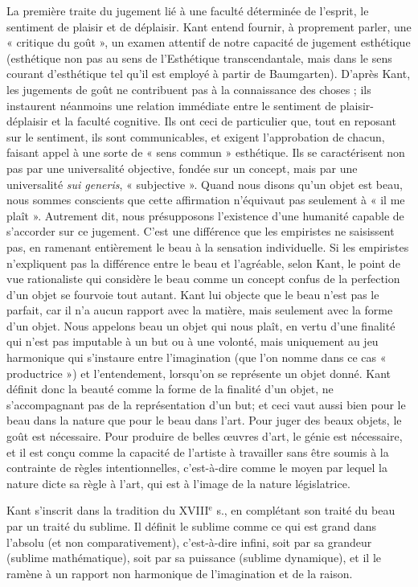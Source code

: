 La première traite du jugement lié à
une faculté déterminée de l'esprit, le sentiment
de plaisir et de déplaisir. Kant
entend fournir, à proprement parler, une
« critique du goût », un examen attentif
de notre capacité de jugement esthétique
(esthétique non pas au sens de l’Esthétique
transcendantale, mais dans le sens
courant d’esthétique tel qu’il est employé
à partir de Baumgarten). D’après Kant,
les jugements de goût ne contribuent pas
à la connaissance des choses ; ils instaurent
néanmoins une relation immédiate
entre le sentiment de plaisir-déplaisir et la
faculté cognitive. Ils ont ceci de particulier
que, tout en reposant sur le sentiment,
ils sont communicables, et exigent l’approbation
de chacun, faisant appel à une
sorte de « sens commun » esthétique. Ils
se caractérisent non pas par une universalité
objective, fondée sur un concept, mais
par une universalité {\it sui generis}, « subjective ».
Quand nous disons qu’un objet est
beau, nous sommes conscients que cette
affirmation n’équivaut pas seulement à
« il me plaît ». Autrement dit, nous présupposons
l'existence d’une humanité
capable de s’accorder sur ce jugement.
C’est une différence que les empiristes ne
saisissent pas, en ramenant entièrement le
beau à la sensation individuelle. Si les
empiristes n’expliquent pas la différence
entre le beau et l’agréable, selon Kant, le
point de vue rationaliste qui considère le
beau comme un concept confus de la perfection
d’un objet se fourvoie tout autant.
Kant lui objecte que le beau n’est pas le
parfait, car il n’a aucun rapport avec la
matière, mais seulement avec la forme
d’un objet. Nous appelons beau un objet
qui nous plaît, en vertu d’une finalité qui
n’est pas imputable à un but ou à une
volonté, mais uniquement au jeu harmonique
qui s’instaure entre l'imagination
(que l’on nomme dans ce cas « productrice »)
et l’entendement, lorsqu'on se
représente un objet donné. Kant définit
donc la beauté comme la forme de la finalité
d’un objet, ne s’accompagnant pas de
la représentation d’un but; et ceci vaut
aussi bien pour le beau dans la nature que
pour le beau dans l’art. Pour juger des
beaux objets, le goût est nécessaire. Pour
produire de belles œuvres d’art, le génie
%
est nécessaire, et il est conçu comme la
capacité de l’artiste à travailler sans être
soumis à la contrainte de règles intentionnelles,
c’est-à-dire comme le moyen par
lequel la nature dicte sa règle à l’art, qui
est à l’image de la nature législatrice.

Kant s'inscrit dans la tradition du
{\footnotesize XVIII}$^\text{e}$ s., en complétant son traité du beau
par un traité du sublime. Il définit le
sublime comme ce qui est grand dans l’absolu
(et non comparativement), c’est-à-dire
infini, soit par sa grandeur (sublime
mathématique), soit par sa puissance
(sublime dynamique), et il le ramène à un
rapport non harmonique de l'imagination
et de la raison.

